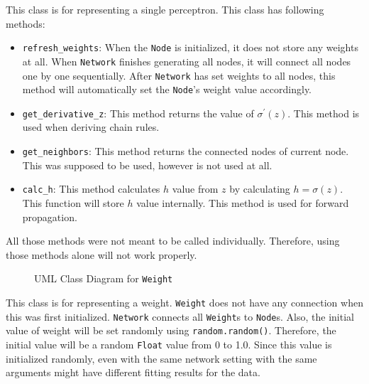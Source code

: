 \documentclass{homework}
\begin{document}
This class is for representing a single perceptron. This class has following methods:
\begin{itemize}
    \item \texttt{refresh_weights}: When the \texttt{Node} is initialized, it does not store any weights at all. When \texttt{Network} finishes generating all nodes, it will connect all nodes one by one sequentially. After \texttt{Network} has set weights to all nodes, this method will automatically set the \texttt{Node}'s weight value accordingly.
    \item \texttt{get_derivative_z}: This method returns the value of $\sigma^\prime(z)$. This method is used when deriving chain rules.
    \item \texttt{get_neighbors}: This method returns the connected nodes of current node. This was supposed to be used, however is not used at all.
    \item \texttt{calc_h}: This method calculates $h$ value from $z$ by calculating $h = \sigma(z)$. This function will store $h$ value internally. This method is used for forward propagation.
\end{itemize}

All those methods were not meant to be called individually. Therefore, using those methods alone will not work properly.

\begin{figure}[h]
\centering
    \caption{UML Class Diagram for \texttt{Weight}}
\end{figure}

This class is for representing a weight. \texttt{Weight} does not have any connection when this was first initialized. \texttt{Network} connects all \texttt{Weight}s to \texttt{Node}s. Also, the initial value of weight will be set randomly using \texttt{random.random()}. Therefore, the initial value will be a random \texttt{Float} value from 0 to 1.0. Since this value is initialized randomly, even with the same network setting with the same arguments might have different fitting results for the data. 

\pagebreak
\end{document}

